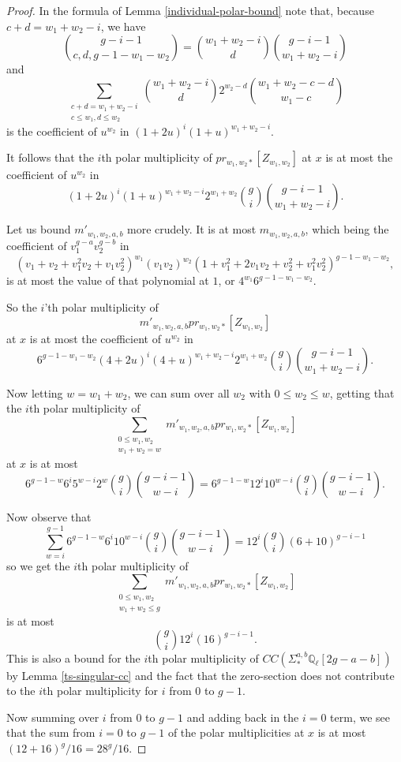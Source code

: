\documentclass[12pt]{amsart}
\theoremstyle{definition}
\theoremstyle{remark}
\begin{document}
\begin{proof} 
In the formula of Lemma \ref{individual-polar-bound} note that, because  $c+d= w_1+w_2-i$, we have \[  {g-i-1 \choose c,d,g-1-w_1-w_2} = {w_1+w_2 -i  \choose d} {g-i-1 \choose w_1 + w_2 -i} \] and \[ \sum_{\substack{c+d = w_1+w_2 -i \\ c \leq w_1, d\leq w_2 }}{w_1+w_2 -i  \choose d}2^{w_2-d} {w_1 + w_2 -c -d \choose w_1 -c } \] is the coefficient of $u^{w_2}$ in  $(1+2u)^i  (1+u)^{w_1+w_2-i}$. 

It follows that the $i$th polar multiplicity of $pr_{w_1,w_2 *} [ Z_{w_1,w_2} ] $ at $x$  is at most the coefficient of  $u^{w_2} $ in \[(1+2u)^i  (1+u)^{w_1+w_2-i}  2^{w_1+ w_2}  {g \choose i}    {g-i-1 \choose w_1 + w_2 -i}. \]

Let us bound $m'_{w_1,w_2,a,b}$ more crudely. It is at most $m_{w_1,w_2,a,b}$, which being the coefficient of $v_1^{g-a} v_2^{g-b}$  in\[  (v_1+ v_2+ v_1^2 v_2 + v_1 v_2^2 )^{w_1} (v_1v_2)^{w_2} ( 1  + v_1^2 + 2v_1 v_2 + v_2^2 + v_1^2 v_2^2 )^{g-1-w_1 -w_2} ,\] is at most the value of that polynomial at $1$, or  $4^{w_1} 6^{g-1-w_1-w_2}$. 

So the $i$'th polar multiplicity of \[ m'_{w_1,w_2,a,b} pr_{w_1,w_2 *} [ Z_{w_1,w_2} ] \] at $x$ is at most the coefficient of $u^{w_2}$ in  \[ 6^{g-1-w_1 -w_2} (4+2u)^i  (4+u )^{w_1+w_2-i} 2^{w_1+w_2}  {g \choose i} {g-i-1 \choose w_1 + w_2 -i}. \]

Now letting $w=w_1+w_2$, we can sum over all $w_2$ with  $0 \leq w_2 \leq w$, getting that the $i$th polar multiplicity of \[ \sum_{\substack{0 \leq w_1,w_2\\ w_1+w_2 =w } }  m'_{w_1,w_2,a,b} pr_{w_1,w_2 *} [ Z_{w_1,w_2} ]\] at $x$ is at most \[ 6^{g-1-w} 6 ^i  5^{w-i} 2^w   {g \choose i}   {g-i-1 \choose w-i} =  6^{g-1-w} 12 ^i  10^{w-i}    {g \choose i}   {g-i-1 \choose w-i} . \]

Now observe that \[\sum_{w=i}^{g-1} 6^{g-1-w} 6^i  10^{w-i}  {g \choose i}    {g-i-1 \choose w-i} =  12^i {g\choose i}  ( 6 + 10)^{ g-i-1} \] so we get the $i$th polar multiplicity of \[ \sum_{\substack{ 0\leq w_1,w_2 \\ w_1+w_2 \leq g} }m'_{w_1,w_2,a,b} pr_{w_1,w_2 *} [ Z_{w_1,w_2} ]\] is at most \[   {g \choose i} 12^i (16)^{g-i-1}.\] This is also a bound for the $i$th polar multiplicity of $CC  ( \Sigma^{a,b}_* \mathbb Q_\ell[2g-a-b] )$ by Lemma \ref{ts-singular-cc} and the fact that the zero-section does not contribute to the $i$th polar multiplicity for $i$ from $0$ to $g-1$. 

Now summing over $i$ from $0$ to $g-1$ and adding back in the $i=0$ term, we see that the sum from $i=0$ to $g-1$ of the polar multiplicities at $x$ is at most $ ( 12+ 16)^{g} / 16 = 28^g/ 16$.\end{proof} 
\end{document}
